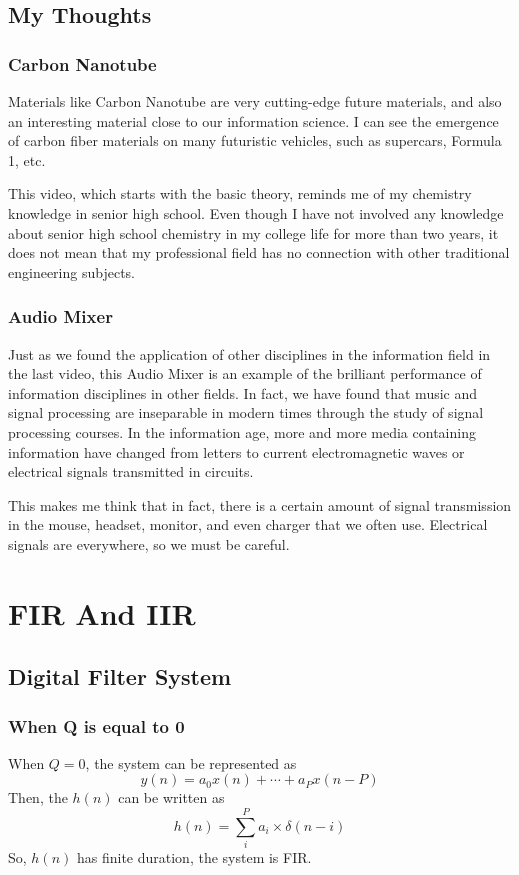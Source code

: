 \documentclass{article}
\begin{document}
\subsection{My Thoughts}
\subsubsection*{Carbon Nanotube}
Materials like Carbon Nanotube are very cutting-edge future materials, and also an interesting material close to our information science. I can see the emergence of carbon fiber materials on many futuristic vehicles, such as supercars, Formula 1, etc.

This video, which starts with the basic theory, reminds me of my chemistry knowledge in senior high school. Even though I have not involved any knowledge about senior high school chemistry in my college life for more than two years, it does not mean that my professional field has no connection with other traditional engineering subjects.

\subsubsection*{Audio Mixer}
Just as we found the application of other disciplines in the information field in the last video, this Audio Mixer is an example of the brilliant performance of information disciplines in other fields. In fact, we have found that music and signal processing are inseparable in modern times through the study of signal processing courses. In the information age, more and more media containing information have changed from letters to current electromagnetic waves or electrical signals transmitted in circuits.

This makes me think that in fact, there is a certain amount of signal transmission in the mouse, headset, monitor, and even charger that we often use. Electrical signals are everywhere, so we must be careful.


\section{FIR And IIR}
\subsection{Digital Filter System}
\subsubsection{When Q is equal to 0}
When $Q = 0$, the system can be represented as 
$$
y(n) = a_0x(n) + \cdots + a_Px(n - P)
$$
Then, the $h(n)$ can be written as
$$
h(n) =  \sum_i^P a_i \times \delta(n - i)
$$
So, $h(n)$ has finite duration, the system is FIR.
\end{document}
